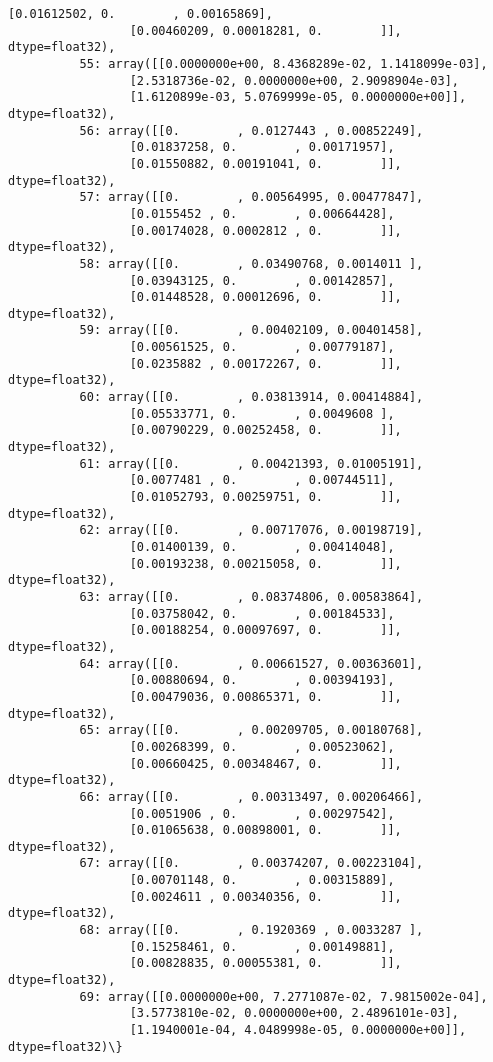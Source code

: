 \documentclass[11pt]{article}
\begin{document}
\begin{Verbatim}[commandchars=\\\{\}]
                 [0.01612502, 0.        , 0.00165869],
                 [0.00460209, 0.00018281, 0.        ]], dtype=float32),
          55: array([[0.0000000e+00, 8.4368289e-02, 1.1418099e-03],
                 [2.5318736e-02, 0.0000000e+00, 2.9098904e-03],
                 [1.6120899e-03, 5.0769999e-05, 0.0000000e+00]], dtype=float32),
          56: array([[0.        , 0.0127443 , 0.00852249],
                 [0.01837258, 0.        , 0.00171957],
                 [0.01550882, 0.00191041, 0.        ]], dtype=float32),
          57: array([[0.        , 0.00564995, 0.00477847],
                 [0.0155452 , 0.        , 0.00664428],
                 [0.00174028, 0.0002812 , 0.        ]], dtype=float32),
          58: array([[0.        , 0.03490768, 0.0014011 ],
                 [0.03943125, 0.        , 0.00142857],
                 [0.01448528, 0.00012696, 0.        ]], dtype=float32),
          59: array([[0.        , 0.00402109, 0.00401458],
                 [0.00561525, 0.        , 0.00779187],
                 [0.0235882 , 0.00172267, 0.        ]], dtype=float32),
          60: array([[0.        , 0.03813914, 0.00414884],
                 [0.05533771, 0.        , 0.0049608 ],
                 [0.00790229, 0.00252458, 0.        ]], dtype=float32),
          61: array([[0.        , 0.00421393, 0.01005191],
                 [0.0077481 , 0.        , 0.00744511],
                 [0.01052793, 0.00259751, 0.        ]], dtype=float32),
          62: array([[0.        , 0.00717076, 0.00198719],
                 [0.01400139, 0.        , 0.00414048],
                 [0.00193238, 0.00215058, 0.        ]], dtype=float32),
          63: array([[0.        , 0.08374806, 0.00583864],
                 [0.03758042, 0.        , 0.00184533],
                 [0.00188254, 0.00097697, 0.        ]], dtype=float32),
          64: array([[0.        , 0.00661527, 0.00363601],
                 [0.00880694, 0.        , 0.00394193],
                 [0.00479036, 0.00865371, 0.        ]], dtype=float32),
          65: array([[0.        , 0.00209705, 0.00180768],
                 [0.00268399, 0.        , 0.00523062],
                 [0.00660425, 0.00348467, 0.        ]], dtype=float32),
          66: array([[0.        , 0.00313497, 0.00206466],
                 [0.0051906 , 0.        , 0.00297542],
                 [0.01065638, 0.00898001, 0.        ]], dtype=float32),
          67: array([[0.        , 0.00374207, 0.00223104],
                 [0.00701148, 0.        , 0.00315889],
                 [0.0024611 , 0.00340356, 0.        ]], dtype=float32),
          68: array([[0.        , 0.1920369 , 0.0033287 ],
                 [0.15258461, 0.        , 0.00149881],
                 [0.00828835, 0.00055381, 0.        ]], dtype=float32),
          69: array([[0.0000000e+00, 7.2771087e-02, 7.9815002e-04],
                 [3.5773810e-02, 0.0000000e+00, 2.4896101e-03],
                 [1.1940001e-04, 4.0489998e-05, 0.0000000e+00]], dtype=float32)\}
\end{Verbatim}
            
\end{document}
